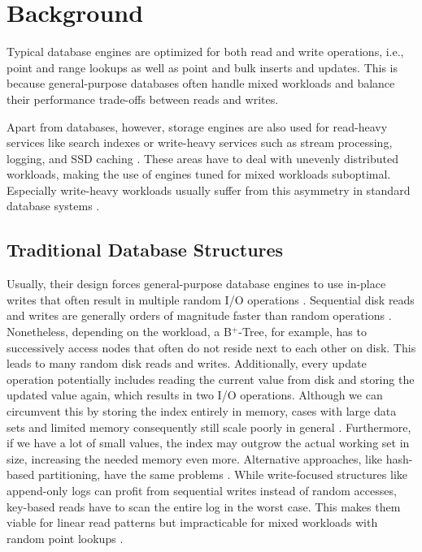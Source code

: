 
\chapter{Background}\label{chapter:background}

Typical database engines are optimized for both read and write operations, i.e., point and range lookups as well as point and bulk inserts and updates. This is because general-purpose databases often handle mixed workloads and balance their performance trade-offs between reads and writes.

Apart from databases, however, storage engines are also used for read-heavy services like search indexes or write-heavy services such as stream processing, logging, and SSD caching \cite{lsm_data_stores_leveldb_rocksdb}. These areas have to deal with unevenly distributed workloads, making the use of engines tuned for mixed workloads suboptimal. Especially write-heavy workloads usually suffer from this asymmetry in standard database systems \cite{performace_evaluation}.

\section{Traditional Database Structures}\label{2.1}

Usually, their design forces general-purpose database engines to use in-place writes that often result in multiple random I/O operations \cite{in-place-updates}. Sequential disk reads and writes are generally orders of magnitude faster than random operations \cite{seq_rand}. Nonetheless, depending on the workload, a B$^+$-Tree, for example, has to successively access nodes that often do not reside next to each other on disk. This leads to many random disk reads and writes.\newline
Additionally, every update operation potentially includes reading the current value from disk and storing the updated value again, which results in two I/O operations. Although we can circumvent this by storing the index entirely in memory, cases with large data sets and limited memory consequently still scale poorly in general \cite{leanstore}. Furthermore, if we have a lot of small values, the index may outgrow the actual working set in size, increasing the needed memory even more. Alternative approaches, like hash-based partitioning, have the same problems \cite{hash_index}.\newline
While write-focused structures like append-only logs can profit from sequential writes instead of random accesses, key-based reads have to scan the entire log in the worst case. This makes them viable for linear read patterns but impracticable for mixed workloads with random point lookups \cite{i_heart_logs,log_presentation}.

